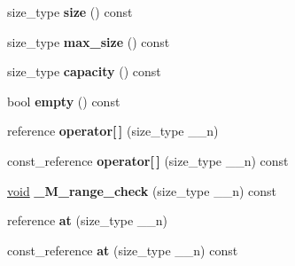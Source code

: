 \begin{DoxyCompactItemize}
\mbox{\label{class_____b_v_e_c_t_o_r___q_u_a_l_i_f_i_e_d_a1644401234ea4a522e4c9d4235994b6c}} 
size\+\_\+type {\bfseries size} () const
\item 
\mbox{\label{class_____b_v_e_c_t_o_r___q_u_a_l_i_f_i_e_d_ab7c8ce9a9ebd237c148c8861bc8fdef8}} 
size\+\_\+type {\bfseries max\+\_\+size} () const
\item 
\mbox{\label{class_____b_v_e_c_t_o_r___q_u_a_l_i_f_i_e_d_a50f3401fbfabd142922f52bf69f079dd}} 
size\+\_\+type {\bfseries capacity} () const
\item 
\mbox{\label{class_____b_v_e_c_t_o_r___q_u_a_l_i_f_i_e_d_a7190b57d23a254dd5473df8990e2e8f3}} 
bool {\bfseries empty} () const
\item 
\mbox{\label{class_____b_v_e_c_t_o_r___q_u_a_l_i_f_i_e_d_a661f756c170666d8a6d7c27977bbaed6}} 
reference {\bfseries operator\mbox{[}$\,$\mbox{]}} (size\+\_\+type \+\_\+\+\_\+n)
\item 
\mbox{\label{class_____b_v_e_c_t_o_r___q_u_a_l_i_f_i_e_d_ab5e8375afc498a21e79d771e5c8689ea}} 
const\+\_\+reference {\bfseries operator\mbox{[}$\,$\mbox{]}} (size\+\_\+type \+\_\+\+\_\+n) const
\item 
\mbox{\label{class_____b_v_e_c_t_o_r___q_u_a_l_i_f_i_e_d_a40db84816c0f38c9dcb45b9c36fbe1dc}} 
\hyperlink{interfacevoid}{void} {\bfseries \+\_\+\+M\+\_\+range\+\_\+check} (size\+\_\+type \+\_\+\+\_\+n) const
\item 
\mbox{\label{class_____b_v_e_c_t_o_r___q_u_a_l_i_f_i_e_d_a2b469f9a4cbec58e1c2ca7421aafda0c}} 
reference {\bfseries at} (size\+\_\+type \+\_\+\+\_\+n)
\item 
\mbox{\label{class_____b_v_e_c_t_o_r___q_u_a_l_i_f_i_e_d_a92da24becd32b6b0161963a70b5518ec}} 
const\+\_\+reference {\bfseries at} (size\+\_\+type \+\_\+\+\_\+n) const

\end{DoxyCompactItemize}
